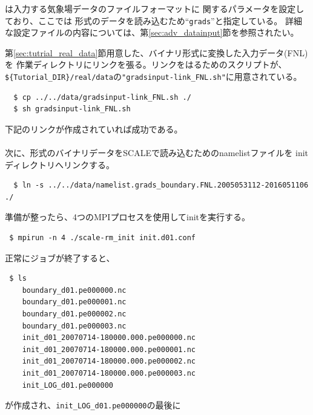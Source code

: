 \noindent {}は入力する気象場データのファイルフォーマットに
関するパラメータを設定しており、ここでは
{\grads}形式のデータを読み込むため``\verb|grads|''と指定している。
詳細な設定ファイルの内容については、第\ref{sec:adv_datainput}節を参照されたい。


第\ref{sec:tutrial_real_data}節用意した、バイナリ形式に変換した入力データ(FNL)を
作業ディレクトリにリンクを張る。リンクをはるためのスクリプトが、
\verb|${Tutorial_DIR}/real/data|の\verb|"gradsinput-link_FNL.sh"|に用意されている。
\begin{verbatim}
  $ cp ../../data/gradsinput-link_FNL.sh ./
  $ sh gradsinput-link_FNL.sh
\end{verbatim}
下記のリンクが作成されていれば成功である。\\

\\


次に、{\grads}形式のバイナリデータをSCALEで読み込むためのnamelistファイルを
initディレクトリへリンクする。
\begin{verbatim}
  $ ln -s ../../data/namelist.grads_boundary.FNL.2005053112-2016051106 ./
\end{verbatim}
%
準備が整ったら、4つのMPIプロセスを使用してinitを実行する。
\begin{verbatim}
 $ mpirun -n 4 ./scale-rm_init init.d01.conf
\end{verbatim}

正常にジョブが終了すると、
\begin{verbatim}
 $ ls
    boundary_d01.pe000000.nc
    boundary_d01.pe000001.nc
    boundary_d01.pe000002.nc
    boundary_d01.pe000003.nc
    init_d01_20070714-180000.000.pe000000.nc
    init_d01_20070714-180000.000.pe000001.nc
    init_d01_20070714-180000.000.pe000002.nc
    init_d01_20070714-180000.000.pe000003.nc
    init_LOG_d01.pe000000
\end{verbatim}
が作成され、\verb|init_LOG_d01.pe000000|の最後に\\


